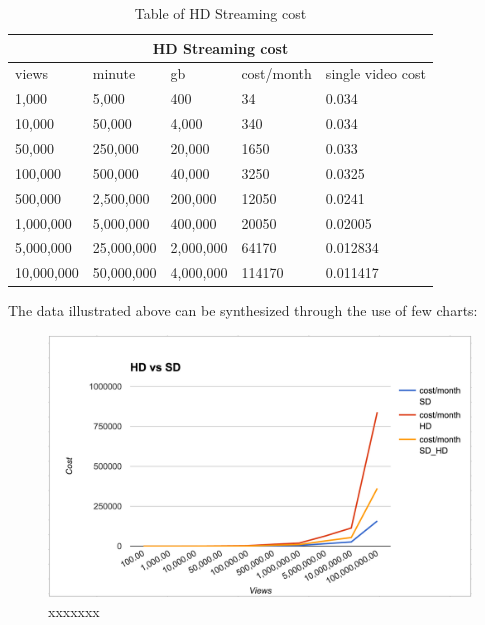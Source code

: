 \begin{table}
\centering 
\begin{tabular}{ |p{2cm}|p{2cm}|p{2cm}|p{2cm}|p{2cm}| }
  \hline
  \multicolumn{5}{|c|}{HD Streaming cost} \\
  \hline
  views & minute & gb & cost/month & single video cost\\
  \hline
1,000 & 5,000 & 400 & 34 & 0.034 \\
10,000 & 50,000 & 4,000 & 340 & 0.034\\
50,000 & 250,000 & 20,000 & 1650 & 0.033\\
100,000 & 500,000 & 40,000 & 3250 & 0.0325\\
500,000 & 2,500,000 & 200,000 & 12050 & 0.0241\\
1,000,000 & 5,000,000 & 400,000 & 20050 & 0.02005\\
5,000,000 & 25,000,000 & 2,000,000 & 64170 & 0.012834\\
10,000,000 & 50,000,000 & 4,000,000 & 114170 & 0.011417\\
  \hline
\end{tabular}
\caption{Table of HD Streaming cost}
\label{table:1}
\end{table}

The data illustrated above can be synthesized through the use of few charts:

\begin{figure}[htb]
 \centering
 \includegraphics[width=1.0\linewidth]{images/chapter3/grafico.png}\hfill
 \caption[xxxxxxx]{xxxxxxx}
 \label{fig:fourV}
\end{figure}
